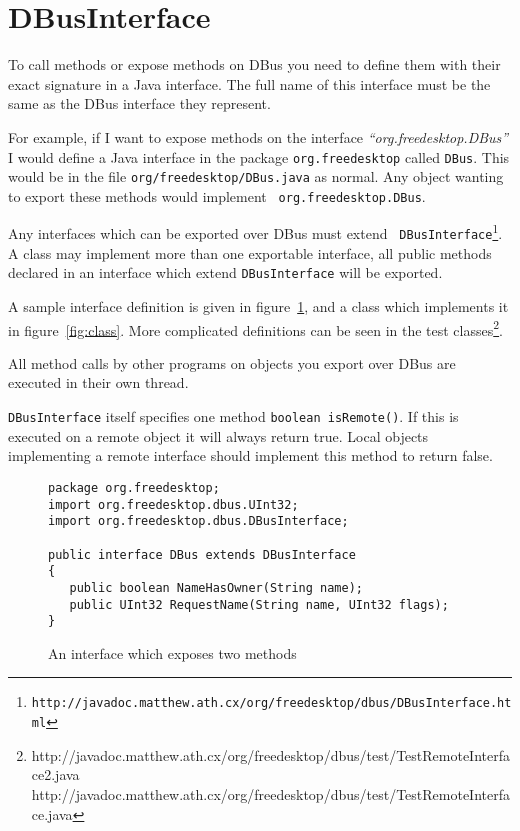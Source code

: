 \documentclass[a4paper,12pt]{article}
\begin{document}
\section{DBusInterface}

To call methods or expose methods on DBus you need to define them
with their exact signature in a Java interface. The full name of
this interface must be the same as the DBus interface they
represent.

For example, if I want to expose methods on the interface
{\em ``org.freedesktop.DBus''} I would define a Java interface in
the package {\tt org.freedesktop} called {\tt DBus}. This would be
in the file {\tt org/freedesktop/DBus.java} as normal. Any object
wanting to export these methods would implement {\tt
org.freedesktop.DBus}.

Any interfaces which can be exported over DBus must extend {\tt
DBusInterface\footnote{http://javadoc.matthew.ath.cx/org/freedesktop/dbus/DBusInterface.html}}.
A class may implement more than one exportable interface, all public
methods declared in an interface which extend {\tt DBusInterface}
will be exported.

A sample interface definition is given in
figure~\ref{fig:interface}, and a class which implements it in
figure~\ref{fig:class}. More complicated definitions can be seen in
the test
classes\footnote{http://javadoc.matthew.ath.cx/org/freedesktop/dbus/test/TestRemoteInterface2.java
http://javadoc.matthew.ath.cx/org/freedesktop/dbus/test/TestRemoteInterface.java}.

All method calls by other programs on objects you export over DBus
are executed in their own thread.

{\tt DBusInterface} itself specifies one method \verb&boolean isRemote()&. If this is executed on a remote object it will always
return true. Local objects implementing a remote interface should
implement this method to return false.

\begin{figure}[htb]
\begin{center}
\begin{verbatim}
package org.freedesktop;
import org.freedesktop.dbus.UInt32;
import org.freedesktop.dbus.DBusInterface;

public interface DBus extends DBusInterface
{
   public boolean NameHasOwner(String name);
   public UInt32 RequestName(String name, UInt32 flags);
}
\end{verbatim}
\end{center}
\caption{An interface which exposes two methods}
\label{fig:interface}
\end{figure}
\end{document}
